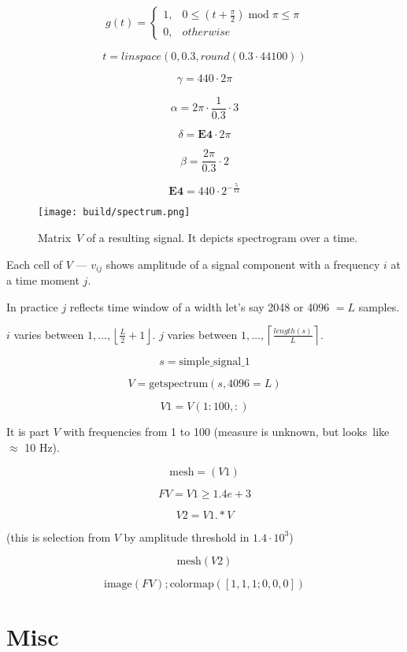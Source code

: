 \documentclass[oneside, final, 14pt]{extarticle}
\begin{document}
\[
  g(t) =
  \begin{cases}
    1, & 0 \leqslant \left( t + \frac{\pi}{2} \right)
      \; \text{mod} \; \pi \leqslant \pi \\
    0, & otherwise
  \end{cases}
\]

$$t = linspace(0, 0.3, round(0.3 \cdot 44100))$$

$$\gamma = 440 \cdot 2 \pi$$

$$\alpha = 2 \pi \cdot \frac{1}{0.3} \cdot 3$$

$$\delta = \textbf{E4} \cdot 2 \pi$$

$$\beta = \frac{2 \pi}{0.3} \cdot 2$$

$$\textbf{E4} = 440 \cdot 2^{-\frac{5}{12}}$$

\begin{figure}
  \texttt{[image: build/spectrum.png]}
  \caption{Matrix~$V$ of a resulting signal.
  It depicts spectrogram over a time.}
\end{figure}

Each cell of $V$ --- $v_{ij}$ shows amplitude
of a signal component with a frequency $i$
at a time moment $j$.

In practice $j$ reflects time window of a width
let's say 2048 or 4096 $= L$ samples.

$i$ varies between $1, \dots, \left\lfloor \frac{L}{2}+1 \right\rfloor$.
$j$ varies between $1, \dots, \left\lceil \frac{length(s)}{L} \right\rceil$.

$$s = \text{simple\_signal\_1}$$

$$V = \text{getspectrum}(s,4096 = L)$$

$$V1 = V(1:100,:)$$

It is part $V$ with frequencies from 1 to 100 (measure is unknown,
but looks~like $\approx$ 10 Hz).

$$\text{mesh} = (V1)$$

$$FV = V1 \geqslant 1.4e+3$$

$$V2 = V1 .*  V$$

(this is selection from $V$ by amplitude threshold in $1.4 \cdot 10^3$)

$$\text{mesh}(V2)$$

$$\text{image}(FV); \text{colormap}([1, 1, 1; 0, 0, 0])$$

\section{Misc}
\end{document}
